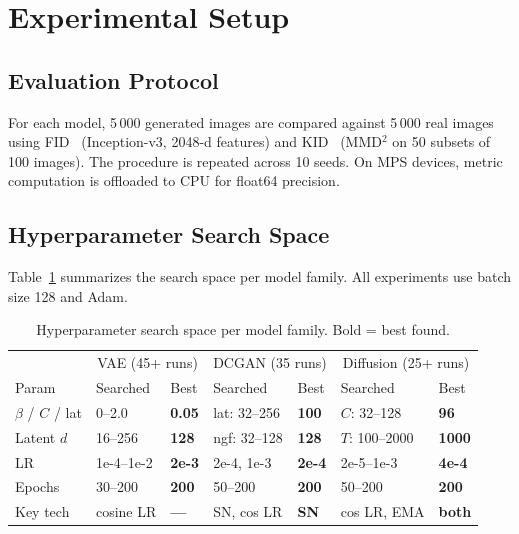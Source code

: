 \documentclass[runningheads]{llncs}
\begin{document}
\section{Experimental Setup}\label{sec:setup}

\subsection{Evaluation Protocol}

For each model, 5\,000 generated images are compared against 5\,000 real images using FID~\cite{heusel2017} (Inception-v3, 2048-d features) and KID~\cite{binkowski2018} (MMD$^2$ on 50 subsets of 100 images). The procedure is repeated across 10 seeds. On MPS devices, metric computation is offloaded to CPU for float64 precision.

\subsection{Hyperparameter Search Space}

Table~\ref{tab:search_all} summarizes the search space per model family. All experiments use batch size 128 and Adam.

\begin{table}[htbp]
\caption{Hyperparameter search space per model family. Bold = best found.}\label{tab:search_all}
\centering\small
\begin{tabular}{l|ll|ll|ll}
\toprule
& \multicolumn{2}{c|}{VAE (45+ runs)} & \multicolumn{2}{c|}{DCGAN (35 runs)} & \multicolumn{2}{c}{Diffusion (25+ runs)} \\
Param & Searched & Best & Searched & Best & Searched & Best \\
\midrule
$\beta$ / $C$ / lat & 0--2.0 & \textbf{0.05} & lat: 32--256 & \textbf{100} & $C$: 32--128 & \textbf{96} \\
Latent $d$ & 16--256 & \textbf{128} & ngf: 32--128 & \textbf{128} & $T$: 100--2000 & \textbf{1000} \\
LR & 1e-4--1e-2 & \textbf{2e-3} & 2e-4, 1e-3 & \textbf{2e-4} & 2e-5--1e-3 & \textbf{4e-4} \\
Epochs & 30--200 & \textbf{200} & 50--200 & \textbf{200} & 50--200 & \textbf{200} \\
Key tech & cosine LR & \textbf{---} & SN, cos LR & \textbf{SN} & cos LR, EMA & \textbf{both} \\
\bottomrule
\end{tabular}
\end{table}
\end{document}
